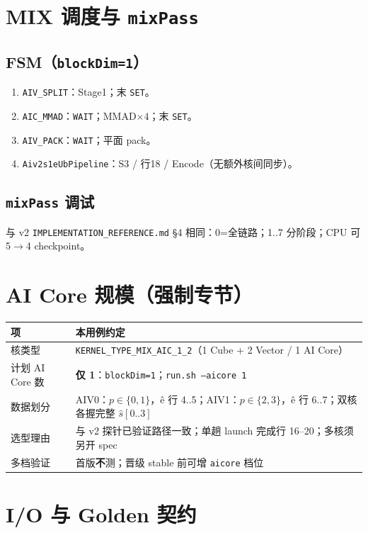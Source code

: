 \documentclass[UTF8,a4paper,11pt]{ctexart}
\begin{document}
\section{MIX 调度与 \texttt{mixPass}}

\subsection{FSM（\texttt{blockDim=1}）}
\begin{enumerate}
  \item \texttt{AIV\_SPLIT}：Stage1；末 \texttt{SET}。
  \item \texttt{AIC\_MMAD}：\texttt{WAIT}；MMAD$\times 4$；末 \texttt{SET}。
  \item \texttt{AIV\_PACK}：\texttt{WAIT}；平面 pack。
  \item \texttt{Aiv2s1eUbPipeline}：S3 / 行18 / Encode（无额外核间同步）。
\end{enumerate}

\subsection{\texttt{mixPass} 调试}
与 v2 \texttt{IMPLEMENTATION\_REFERENCE.md} §4 相同：0=全链路；1..7 分阶段；CPU 可 5$\rightarrow$4 checkpoint。

\section{AI Core 规模（强制专节）}
\label{sec:aicore}

\begin{longtable}{@{}L{2.8cm}L{10.5cm}@{}}
\toprule
项 & 本用例约定 \\
\midrule
核类型 & \texttt{KERNEL\_TYPE\_MIX\_AIC\_1\_2}（1 Cube + 2 Vector / 1 AI Core） \\
计划 AI Core 数 & \textbf{仅 1}：\texttt{blockDim=1}；\texttt{run.sh --aicore 1} \\
数据划分 & AIV0：$p\in\{0,1\}$，ê 行 4..5；AIV1：$p\in\{2,3\}$，ê 行 6..7；双核各握完整 $\hat{s}[0..3]$ \\
选型理由 & 与 v2 探针已验证路径一致；单趟 launch 完成行 16–20；多核须另开 spec \\
多档验证 & 首版\textbf{不}测；晋级 stable 前可增 \texttt{aicore} 档位 \\
\bottomrule
\end{longtable}

\section{I/O 与 Golden 契约}
\end{document}
